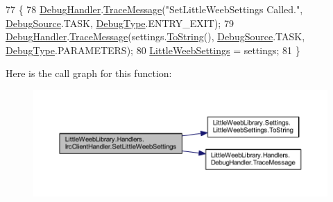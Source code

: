 \begin{DoxyCode}
77         \{
78             \mbox{\hyperlink{class_little_weeb_library_1_1_handlers_1_1_irc_client_handler_ab50ece494948d25db1839f4d6eab038f}{DebugHandler}}.\mbox{\hyperlink{interface_little_weeb_library_1_1_handlers_1_1_i_debug_handler_a2e405bc3492e683cd3702fae125221bc}{TraceMessage}}(\textcolor{stringliteral}{"SetLittleWeebSettings Called."}, 
      \mbox{\hyperlink{namespace_little_weeb_library_1_1_handlers_a2a6ca0775121c9c503d58aa254d292be}{DebugSource}}.TASK, \mbox{\hyperlink{namespace_little_weeb_library_1_1_handlers_ab66019ed40462876ec4e61bb3ccb0a62}{DebugType}}.ENTRY\_EXIT);
79             \mbox{\hyperlink{class_little_weeb_library_1_1_handlers_1_1_irc_client_handler_ab50ece494948d25db1839f4d6eab038f}{DebugHandler}}.\mbox{\hyperlink{interface_little_weeb_library_1_1_handlers_1_1_i_debug_handler_a2e405bc3492e683cd3702fae125221bc}{TraceMessage}}(settings.\mbox{\hyperlink{class_little_weeb_library_1_1_settings_1_1_little_weeb_settings_a5a5b722dd8e117be810022882795b6ae}{ToString}}(), 
      \mbox{\hyperlink{namespace_little_weeb_library_1_1_handlers_a2a6ca0775121c9c503d58aa254d292be}{DebugSource}}.TASK, \mbox{\hyperlink{namespace_little_weeb_library_1_1_handlers_ab66019ed40462876ec4e61bb3ccb0a62}{DebugType}}.PARAMETERS);
80             \mbox{\hyperlink{class_little_weeb_library_1_1_settings_1_1_little_weeb_settings}{LittleWeebSettings}} = settings;
81         \}
\end{DoxyCode}
Here is the call graph for this function\+:\nopagebreak
\begin{figure}[H]
\begin{center}
\leavevmode
\includegraphics[width=350pt]{class_little_weeb_library_1_1_handlers_1_1_irc_client_handler_ae0b7e9fc2b6c7874a6be2a938f88fc1a_cgraph}
\end{center}
\end{figure}
\mbox{\label{class_little_weeb_library_1_1_handlers_1_1_irc_client_handler_aafe7e3669d3fdd8a0a3c37a240b3c574}} 
